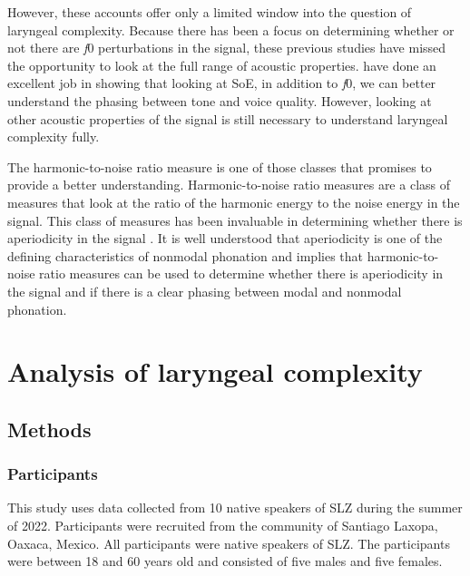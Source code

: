 However, these accounts offer only a limited window into the question of laryngeal complexity. Because there has been a focus on determining whether or not there are \textit{f}0 perturbations in the signal, these previous studies have missed the opportunity to look at the full range of acoustic properties. \citet{wellerInteractionsToneGlottalization2023,wellerLexicalToneVowel2023,wellerVoiceQualityTone2024} have done an excellent job in showing that looking at SoE, in addition to \textit{f}0, we can better understand the phasing between tone and voice quality. However, looking at other acoustic properties of the signal is still necessary to understand laryngeal complexity fully. 

The harmonic-to-noise ratio measure is one of those classes that promises to provide a better understanding. Harmonic-to-noise ratio measures are a class of measures that look at the ratio of the harmonic energy to the noise energy in the signal. This class of measures has been invaluable in determining whether there is aperiodicity in the signal \citep{dekromCepstrumBasedTechniqueDetermining1993,ferrerriesgoWhatMakesCepstral2020,garellekPhoneticsVoice2019}. It is well understood that aperiodicity is one of the defining characteristics of nonmodal phonation \citep{ladefogedSoundsWorldsLanguages1996} and implies that harmonic-to-noise ratio measures can be used to determine whether there is aperiodicity in the signal and if there is a clear phasing between modal and nonmodal phonation.



\section{Analysis of laryngeal complexity}\label{sec:analysis_of_lc}
\subsection{Methods} \label{sec:methods}
\subsubsection{Participants} \label{sec:participants}
This study uses data collected from 10 native speakers of SLZ during the summer of 2022. Participants were recruited from the community of Santiago Laxopa, Oaxaca, Mexico. All participants were native speakers of SLZ. The participants were between 18 and 60 years old and consisted of five males and five females.

